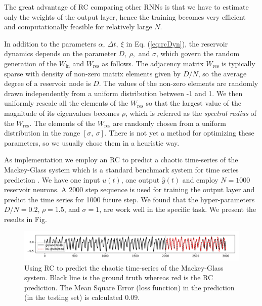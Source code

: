 \documentclass[12pt,letterpaper]{article}
\newcommand{\yy}{{\bf y}}
\providecommand{\yy}[0]{{ \bf{y} }}
\providecommand{\rr}[0]{{ \bf{r} }}
\begin{document}
%
%
The great advantage of RC comparing other RNNs is that we have to estimate only the weights of the output layer, hence the training becomes very efficient and  computationally feasible for relatively large $N$.

In addition to the parameters $\alpha,\ \Delta t,\ \xi$ in Eq. (\ref{eq:rcDyn}), the reservoir dynamics depends on the parameter $D,\ \rho,$ and $\sigma$, which govern the random generation of the $W_\text{in}$ and $W_\text{res}$ as follows. The adjacency matrix $W_\text{res}$ is typically  sparse with density of non-zero matrix elements given by $D/N$, so the average degree of a reservoir node is $D$. The values of the non-zero elements are randomly drawn independently from a uniform distribution between -1 and 1. We then uniformly rescale all the elements of the $W_\text{res}$ so that the largest value of the magnitude of its eigenvalues becomes $\rho$, which is referred as the \emph{spectral radius} of the $W_\text{res}$. The elements of the $W_\text{res}$ are randomly chosen from a uniform distribution in the range $[\sigma, \ \sigma]$. There is not yet a method for optimizing these parameters, so we usually chose them in a heuristic way.

As implementation we employ an RC to predict a chaotic time-series of the Mackey-Glass system which is a standard benchmark system for time series prediction \cite{RC_paper2002}. We have one input $u(t)$, one output $\hat y(t)$ and employ $N=1000$  reservoir neurons. A 2000 step sequence is used for training the output layer and predict the time series for 1000 future step. We found that the hyper-parameters  $D/N=0.2$, $\rho=1.5$, and $\sigma=1$, are work well in the specific task. We present the results in Fig. 
\begin{figure}[ht!]
\centering
\includegraphics[scale=.5]{MG.png}
\caption{Using RC to predict the chaotic time-series of the Mackey-Glass system. Black line is the ground truth whereas red is the RC prediction. The Mean Square Error (loss function) in the prediction (in the testing set) is calculated 0.09.}
\end{figure}
\end{document}
